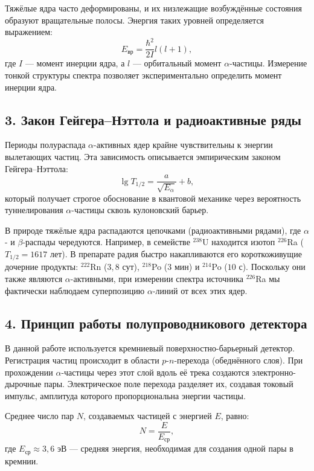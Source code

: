 \documentclass[12pt, a4paper]{article}
\begin{document}
Тяжёлые ядра часто деформированы, и их низлежащие возбуждённые состояния образуют вращательные полосы. Энергия таких уровней определяется выражением:
\begin{equation}
    E_{\text{вр}} = \frac{\hbar^2}{2I} l(l+1),
\end{equation}
где $I$ --- момент инерции ядра, а $l$ --- орбитальный момент $\alpha$-частицы. Измерение тонкой структуры спектра позволяет экспериментально определить момент инерции ядра.

\subsection*{3. Закон Гейгера--Нэттола и радиоактивные ряды}
Периоды полураспада $\alpha$-активных ядер крайне чувствительны к энергии вылетающих частиц. Эта зависимость описывается эмпирическим законом Гейгера--Нэттола:
\begin{equation}
    \lg T_{1/2} = \frac{a}{\sqrt{E_\alpha}} + b,
\end{equation}
который получает строгое обоснование в квантовой механике через вероятность туннелирования $\alpha$-частицы сквозь кулоновский барьер.

В природе тяжёлые ядра распадаются цепочками (радиоактивными рядами), где $\alpha$- и $\beta$-распады чередуются. Например, в семействе $^{238}$U находится изотоп $^{226}$Ra ($T_{1/2} = 1617$ лет). В препарате радия быстро накапливаются его короткоживущие дочерние продукты: $^{222}$Rn ($3,8$ сут), $^{218}$Po ($3$ мин) и $^{214}$Po ($10$ с). Поскольку они также являются $\alpha$-активными, при измерении спектра источника $^{226}$Ra мы фактически наблюдаем суперпозицию $\alpha$-линий от всех этих ядер.

\subsection*{4. Принцип работы полупроводникового детектора}
В данной работе используется кремниевый поверхностно-барьерный детектор. Регистрация частиц происходит в области $p$-$n$-перехода (обеднённого слоя). При прохождении $\alpha$-частицы через этот слой вдоль её трека создаются электронно-дырочные пары. Электрическое поле перехода разделяет их, создавая токовый импульс, амплитуда которого пропорциональна энергии частицы.

Среднее число пар $N$, создаваемых частицей с энергией $E$, равно:
\begin{equation}
    N = \frac{E}{E_{\text{ср}}},
\end{equation}
где $E_{\text{ср}} \approx 3,6$ эВ --- средняя энергия, необходимая для создания одной пары в кремнии. 
\end{document}
